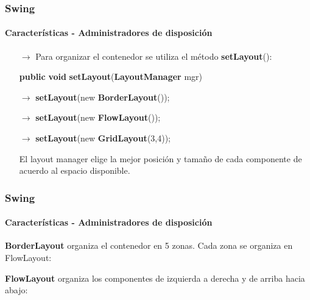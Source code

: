\documentclass{beamer}
\begin{document}
    \begin{frame}
		\frametitle{Swing}
		\framesubtitle{Caracter\'isticas - Administradores de disposici\'on}

		\begin{itemize}
		    \item[$\rightarrow$] Para organizar el contenedor se utiliza el m\'etodo \textbf{setLayout}():
		    \item[] \textbf{public} \textbf{void} \textbf{setLayout}(\textbf{LayoutManager} mgr)
		    \item[]
		    \item[$\rightarrow$] \textbf{setLayout}(new \textbf{BorderLayout}());
		    \item[$\rightarrow$] \textbf{setLayout}(new \textbf{FlowLayout}());
		    \item[$\rightarrow$] \textbf{setLayout}(new \textbf{GridLayout}(3,4));
		    \item[]
		    \item[\checkmark] El layout manager elige la mejor posici\'on y tama\~no de cada componente de acuerdo al espacio disponible.
        \end{itemize}
	\end{frame}

	\begin{frame}
		\frametitle{Swing}
		\framesubtitle{Caracter\'isticas - Administradores de disposici\'on}

		\begin{multicols}{2}
		    \begin{center}
		        \textbf{BorderLayout} organiza el contenedor en 5 zonas. Cada zona se organiza en FlowLayout:
		    \end{center}
		    \begin{center}
		        \textbf{FlowLayout} organiza los componentes de izquierda a derecha y de arriba hacia abajo:
		    \end{center}
		\end{multicols}
	\end{frame}
\end{document}
